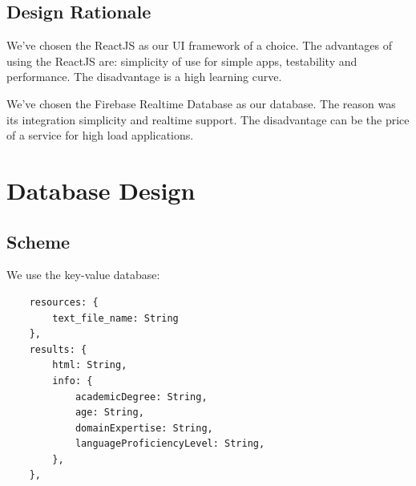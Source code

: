 \documentclass[a4paper,14pt,oneside,final]{memoir}
\begin{document}
\section{Design Rationale}
We've chosen the ReactJS as our UI framework of a choice. The advantages of using the ReactJS are: simplicity of use for simple apps, testability and performance. The disadvantage is a high learning curve.

We've chosen the Firebase Realtime Database as our database. The reason was its integration simplicity and realtime support. The disadvantage can be the price of a service for high load applications.

\chapter{Database Design}
\section{Scheme}
We use the key-value database:
\begin{verbatim}
    resources: {
        text_file_name: String
    },
    results: {
        html: String,
        info: {
            academicDegree: String,
            age: String,
            domainExpertise: String,
            languageProficiencyLevel: String,
        },
    },
\end{verbatim}
\end{document}
